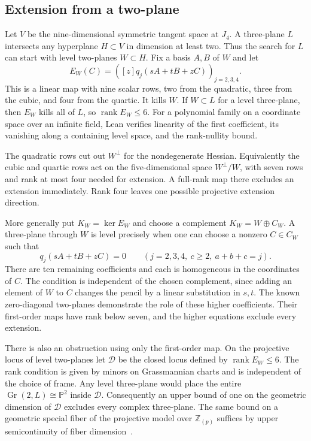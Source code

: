 \subsection{Extension from a two-plane}
\label{sec:gct-extension}

Let \(V\) be the nine-dimensional symmetric tangent space at \(J_4\).
A three-plane \(L\) intersects any hyperplane \(H\subset V\) in
dimension at least two. Thus the search for \(L\) can start with
level two-planes \(W\subset H\). Fix a basis \(A,B\) of \(W\) and
let
\begin{equation*}
  E_W(C)=
  \left([z]q_j(sA+tB+zC)\right)_{j=2,3,4}.
\end{equation*}
This is a linear map with nine scalar rows, two from the quadratic,
three from the cubic, and four from the quartic. It kills \(W\).
If \(W\subset L\) for a level three-plane, then \(E_W\) kills all of
\(L\), so \(\operatorname{rank}E_W\le6\).
For a polynomial family on a coordinate space over an infinite
field, Lean verifies linearity of the first coefficient, its vanishing
along a containing level space, and the rank-nullity bound.

The quadratic rows cut out \(W^\perp\) for the nondegenerate Hessian.
Equivalently the cubic and quartic rows act on the five-dimensional
space \(W^\perp/W\), with seven rows and rank at most four needed for
extension. A full-rank map there excludes an extension immediately.
Rank four leaves one possible projective extension direction.

More generally put \(K_W=\ker E_W\) and choose a complement
\(K_W=W\oplus C_W\). A three-plane through \(W\) is level precisely
when one can choose a nonzero \(C\in C_W\) such that
\begin{equation*}
  [s^a t^b z^c]q_j(sA+tB+zC)=0
  \qquad(j=2,3,4,\ c\ge2,\ a+b+c=j).
\end{equation*}
There are ten remaining coefficients and each is homogeneous in
the coordinates of \(C\). The condition is independent of the chosen
complement, since adding an element of \(W\) to \(C\) changes the pencil
by a linear substitution in \(s,t\). The known zero-diagonal
two-planes demonstrate the role of these higher coefficients. Their
first-order maps have rank below seven, and the higher equations
exclude every extension.

There is also an obstruction using only the first-order map. On the
projective locus of level two-planes let \(\mathcal D\) be the closed
locus defined by \(\operatorname{rank}E_W\le6\). The rank condition
is given by minors on Grassmannian charts and is independent of the
choice of frame. Any level three-plane would place the entire
\(\operatorname{Gr}(2,L)\cong\mathbb P^2\) inside \(\mathcal D\).
Consequently an upper bound of one on the geometric dimension of
\(\mathcal D\) excludes every complex three-plane. The same bound on
a geometric special fiber of the projective model over
\(\mathbb Z_{(p)}\) suffices by upper semicontinuity of fiber
dimension~\cite{stacksfiberdimension}.


